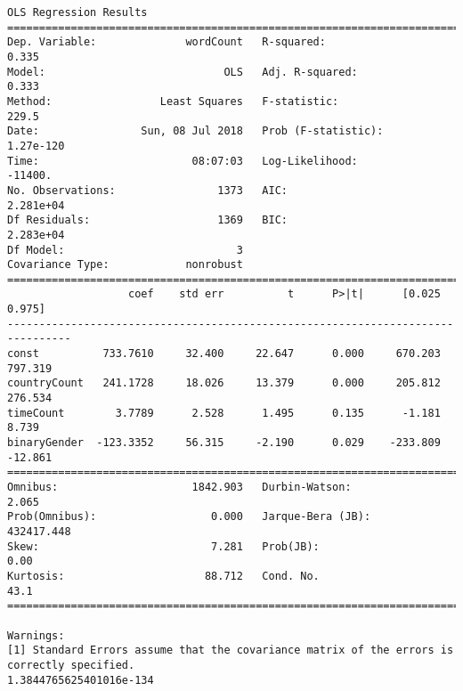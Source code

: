 \documentclass[11pt]{article}
\begin{document}
    \begin{Verbatim}[commandchars=\\\{\}]
                            OLS Regression Results                            
==============================================================================
Dep. Variable:              wordCount   R-squared:                       0.335
Model:                            OLS   Adj. R-squared:                  0.333
Method:                 Least Squares   F-statistic:                     229.5
Date:                Sun, 08 Jul 2018   Prob (F-statistic):          1.27e-120
Time:                        08:07:03   Log-Likelihood:                -11400.
No. Observations:                1373   AIC:                         2.281e+04
Df Residuals:                    1369   BIC:                         2.283e+04
Df Model:                           3                                         
Covariance Type:            nonrobust                                         
================================================================================
                   coef    std err          t      P>|t|      [0.025      0.975]
--------------------------------------------------------------------------------
const          733.7610     32.400     22.647      0.000     670.203     797.319
countryCount   241.1728     18.026     13.379      0.000     205.812     276.534
timeCount        3.7789      2.528      1.495      0.135      -1.181       8.739
binaryGender  -123.3352     56.315     -2.190      0.029    -233.809     -12.861
==============================================================================
Omnibus:                     1842.903   Durbin-Watson:                   2.065
Prob(Omnibus):                  0.000   Jarque-Bera (JB):           432417.448
Skew:                           7.281   Prob(JB):                         0.00
Kurtosis:                      88.712   Cond. No.                         43.1
==============================================================================

Warnings:
[1] Standard Errors assume that the covariance matrix of the errors is correctly specified.
1.3844765625401016e-134

    \end{Verbatim}


    
    
    
    
\end{document}
